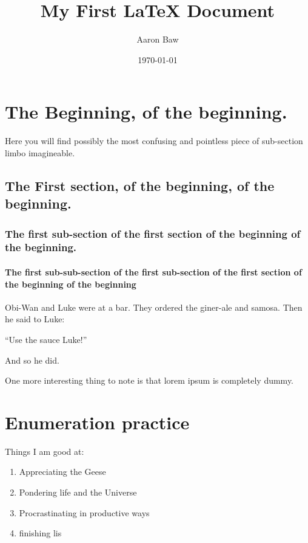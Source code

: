 \documentclass[12pt, twocolumn]{book} %
\title{My First LaTeX Document}
\author{Aaron Baw}
\date{\today}
\begin{document}
\maketitle %

\tableofcontents


\chapter{The Beginning, of the beginning.}
Here you will find possibly the most confusing and pointless piece of sub-section limbo imagineable.

\section{The First section, of the beginning, of the beginning.}

\subsection{The first sub-section of the first section of the beginning of the beginning.}

\subsubsection{The first sub-sub-section of the first sub-section of the first section of the beginning of the beginning}

Obi-Wan and Luke were at a bar. They ordered the giner-ale and samosa. Then he said to Luke:

  ``Use the sauce Luke!''

And so he did.

One more interesting thing to note is that lorem ipsum is completely dummy.

\chapter{Enumeration practice}

Things I am good at:
\begin{enumerate}
\item Appreciating the Geese
\item Pondering life and the Universe
\item Procrastinating in productive ways
\item finishing lis
\end{enumerate}
\end{document}
